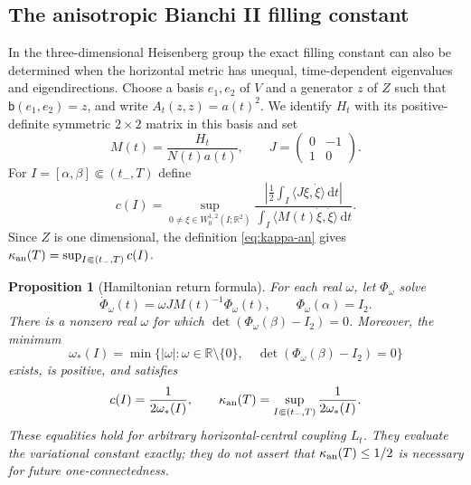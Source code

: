 \documentclass[10pt,a4paper]{article}
\numberwithin{equation}{section}
\newtheorem{proposition}[theorem]{Proposition}
\theoremstyle{definition}
\theoremstyle{remark}
\newcommand{\dd}{\mathrm d}
\begin{document}
\subsection{The anisotropic Bianchi II filling constant}

In the three-dimensional Heisenberg group the exact filling constant can
also be determined when the horizontal metric has unequal, time-dependent
eigenvalues and eigendirections.  Choose a basis $e_1,e_2$ of $V$ and a
generator $z$ of $Z$ such that $\mathsf b(e_1,e_2)=z$, and write
$A_t(z,z)=a(t)^2$.  We identify $H_t$ with its positive-definite symmetric
$2\times2$ matrix in this basis and set
\begin{equation}
 M(t)=\frac{H_t}{N(t)a(t)},
 \qquad
 J=\begin{pmatrix}0&-1\\1&0\end{pmatrix}.
 \label{eq:area-hamiltonian-matrix}
\end{equation}
For $I=[\alpha,\beta]\Subset(t_-,T)$ define
\begin{equation}
 c(I)=\sup_{0\ne\xi\in W^{1,2}_0(I;\mathbb R^2)}
 \frac{\left|\frac12\int_I\langle J\xi,\dot\xi\rangle\,\dd t\right|}
 {\int_I\langle M(t)\dot\xi,\dot\xi\rangle\,\dd t}.
 \label{eq:compact-area-constant}
\end{equation}
Since $Z$ is one dimensional, the definition
\eqref{eq:kappa-an} gives
$\kappa_{\rm an}(T)=\sup_{I\Subset(t_-,T)}c(I)$.

\begin{proposition}[Hamiltonian return formula]
\label{prop:area-return}
For each real $\omega$, let $\Phi_\omega$ solve
\begin{equation}
 \dot\Phi_\omega(t)=\omega J M(t)^{-1}\Phi_\omega(t),
 \qquad \Phi_\omega(\alpha)=I_2.
 \label{eq:area-return-ode}
\end{equation}
There is a nonzero real $\omega$ for which
$\det(\Phi_\omega(\beta)-I_2)=0$.  Moreover, the minimum
\begin{equation}
 \omega_*(I)=\min\bigl\{|\omega|:
 \omega\in\mathbb R\setminus\{0\},\quad
 \det(\Phi_\omega(\beta)-I_2)=0\bigr\}
 \label{eq:first-return-frequency}
\end{equation}
exists, is positive, and satisfies
\begin{equation}
 c(I)=\frac1{2\omega_*(I)},\qquad
 \kappa_{\rm an}(T)
 =\sup_{I\Subset(t_-,T)}\frac1{2\omega_*(I)}.
 \label{eq:exact-anisotropic-return}
\end{equation}
These equalities hold for arbitrary horizontal-central coupling $L_t$.
They evaluate the variational constant exactly; they do not assert that
$\kappa_{\rm an}(T)\le1/2$ is necessary for future one-connectedness.
\end{proposition}
\end{document}
